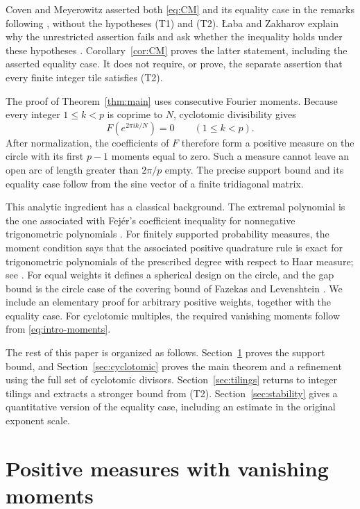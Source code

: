\documentclass[11pt]{article}
\theoremstyle{definition}
\theoremstyle{remark}
\numberwithin{equation}{section}
\begin{document}
Coven and Meyerowitz asserted both \eqref{eq:CM} and its equality case
in the remarks following \cite[Lemma~2.1]{CM}, without the hypotheses
(T1) and (T2). \L aba and Zakharov explain why the unrestricted assertion
fails and ask whether the inequality holds under these hypotheses
\cite[Section~4, equation~(14)]{LZ}. Corollary~\ref{cor:CM} proves the
latter statement, including the asserted equality case. It does not require,
or prove, the separate assertion that every finite integer tile
satisfies (T2).

The proof of Theorem~\ref{thm:main} uses consecutive Fourier moments.
Because every integer $1\le k<p$ is coprime to $N$, cyclotomic
divisibility gives
\begin{equation}\label{eq:intro-moments}
 F(e^{2\pi ik/N})=0\qquad(1\le k<p).
\end{equation}
After normalization, the coefficients of $F$ therefore form a positive
measure on the circle with its first $p-1$ moments equal to zero.
Such a measure cannot leave an open arc of length greater than
$2\pi/p$ empty. The precise support bound and its equality case follow
from the sine vector of a finite tridiagonal matrix.

This analytic ingredient has a classical background. The extremal
polynomial is the one associated with Fej\'er's coefficient inequality
for nonnegative trigonometric polynomials \cite{Fejer}. For finitely
supported probability measures, the moment condition says that the
associated positive quadrature rule is exact for trigonometric
polynomials of the prescribed degree with respect to Haar measure;
see \cite[Section~1]{Peherstorfer}. For equal weights it defines a
spherical design on the circle, and the gap bound is the circle case
of the covering bound of Fazekas and Levenshtein \cite[Theorem~2]{FL}.
We include an elementary proof for arbitrary positive weights, together
with the equality case. For cyclotomic multiples, the required
vanishing moments follow from \eqref{eq:intro-moments}.

The rest of this paper is organized as follows. 
Section~\ref{sec:circle} proves the support bound, and
Section~\ref{sec:cyclotomic} proves the main theorem and a refinement
using the full set of cyclotomic divisors. Section~\ref{sec:tilings}
returns to integer tilings and extracts a stronger bound from (T2).
Section~\ref{sec:stability} gives a quantitative version of the equality
case, including an estimate in the original exponent scale.

\section{Positive measures with vanishing moments}\label{sec:circle}
\end{document}
